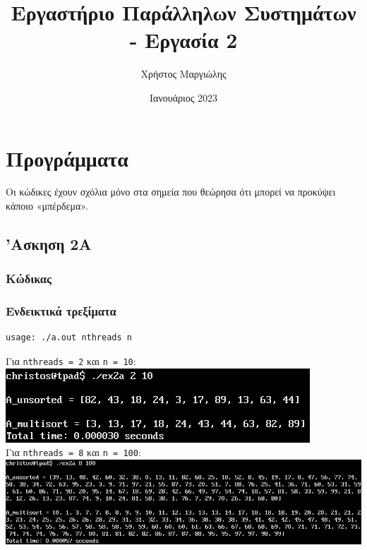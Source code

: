 \documentclass{article}
\title{Εργαστήριο Παράλληλων Συστημάτων - Εργασία 2}
\author{Χρήστος Μαργιώλης}
\date{Ιανουάριος 2023}
\begin{document}
\begin{titlepage}
        \maketitle
\end{titlepage}

\renewcommand{\contentsname}{Περιεχόμενα}
\tableofcontents
\pagebreak

\section{Προγράμματα}

Οι κώδικες έχουν σχόλια μόνο στα σημεία που θεώρησα ότι μπορεί να προκύψει
κάποιο «μπέρδεμα».

\subsection{'Ασκηση 2Α}

\subsubsection{Κώδικας}

\pagebreak
\subsubsection{Ενδεικτικά τρεξίματα}

\begin{lstlisting}
usage: ./a.out nthreads n
\end{lstlisting}

Για \lstinline{nthreads = 2} και \lstinline{n = 10}: \\

\includegraphics[width=\textwidth]{res/ex2a_1.png} \\

Για \lstinline{nthreads = 8} και \lstinline{n = 100}: \\

\includegraphics[width=\textwidth]{res/ex2a_2.png} \\
\end{document}
